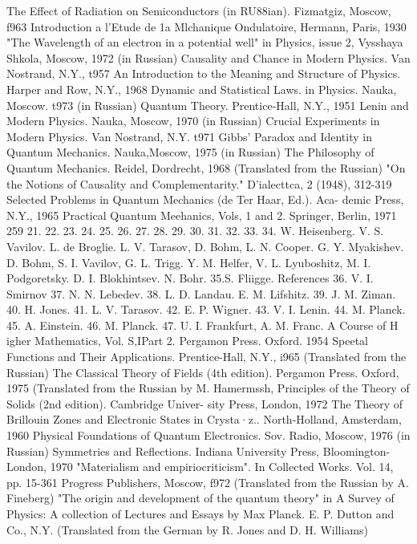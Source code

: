 \documentclass[a4paper,sfsidenotes,colorlinks=true]{tufte-book}
\numberwithin{equation}{section}
\numberwithin{figure}{section}
\begin{document}
{{{{{{{The Effect of Radiation on Semiconductors (in RU88ian). Fizmatgiz, Moscow, f963
Introduction a l'Etude de 1a Mlchanique Ondulatoire, Hermann, Paris, 1930
"The Wavelength of an electron in a potential well" in Physics, issue 2, Vysshaya Shkola, Moscow, 1972 (in Russian)
Causality and Chance in Modern Physics. Van Nostrand, N.Y., t957
An Introduction to the Meaning and Structure of Physics. Harper and Row, N.Y., 1968
Dynamic and Statistical Laws. in Physics. Nauka, Moscow. t973 (in Russian)
Quantum Theory. Prentice-Hall, N.Y., 1951 Lenin and Modern Physics. Nauka, Moscow, 1970 (in Russian)
Crucial Experiments in Modern Physics. Van Nostrand, N.Y. t971
Gibbs' Paradox and Identity in Quantum Mechanics. Nauka,Moscow, 1975 (in Russian)
The Philosophy of Quantum Mechanics. Reidel, Dordrecht, 1968 (Translated from the Russian)
"On the Notions of Causality and Complementarity." D'ialecttca, 2 (1948), 312-319
Selected Problems in Quantum Mechanics (de Ter Haar, Ed.). Aca- demic Press, N.Y., 1965
Practical Quantum Meehanics, Vols, 1 and 2. Springer, Berlin, 1971
259
21. 22. 23. 24. 25. 26.
27.
28. 29. 30.
31.
32. 33. 34.
W. Heisenberg. V. S. Vavilov. L. de Broglie. L. V. Tarasov, D. Bohm,
L. N. Cooper. G. Y. Myakishev.
D. Bohm, S. I. Vavilov, G. L. Trigg.
Y. M. Helfer, V. L. Lyuboshitz, M. I. Podgoretsky.
D. I. Blokhintsev. N. Bohr.
35.S. Fliigge.
References
36. V. I. Smirnov 37. N. N. Lebedev.
38. L. D. Landau. E. M. Lifshitz.
39. J. M. Ziman. 40. H. Jones. 41. L. V. Tarasov. 42. E. P. Wigner. 43. V. I. Lenin.
44. M. Planck.
45. A. Einstein. 46. M. Planck.
47. U. I. Frankfurt, A. M. Franc.
A Course of H igher Mathematics, Vol. S,IPart 2. Pergamon Press. Oxford. 1954
Speetal Functions and Their Applications. Prentice-Hall, N.Y., i965 (Translated from the Russian)
The Classical Theory of Fields (4th edition). Pergamon Press. Oxford, 1975 (Translated from the Russian by M. Hamermssh,
Principles of the Theory of Solids (2nd edition). Cambridge Univer- sity Press, London, 1972
The Theory of Brillouin Zones and Electronic States in Crysta·z..
North-Holland, Amsterdam, 1960
Physical Foundations of Quantum Electronics. Sov. Radio, Moscow, 1976 (in Russian)
Symmetries and Reflections. Indiana University Press, Bloomington- London, 1970
"Materialism and empiriocriticism". In Collected Works. Vol. 14, pp. 15-361 Progress Publishers, Moscow, f972 (Translated from the Russian by A. Fineberg)
"The origin and development of the quantum theory" in A Survey of Physics: A collection of Lectures and Essays by Max Planck. E. P. Dutton and Co., N.Y. (Translated from the German by R. Jones and D. H. Williams)
}}}}}}}
\end{document}
